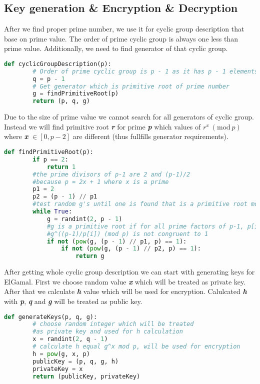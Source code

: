 \documentclass[a4paper,12pt]{article}
\newcommand{\Mod}[1]{\ (\mathrm{mod}\ #1)}
\begin{document}
\subsection{Key generation \& Encryption \& Decryption}
After we find proper prime number, we use it for cyclic group description that base on prime value. 
The order of prime cyclic group is always one less than prime value. Additionally, we need to find generator of that cyclic group. 
\begin{lstlisting}[language=Python]
    def cyclicGroupDescription(p):
        # Order of prime cyclic group is p - 1 as it has p - 1 elements in group
        q = p - 1
        # Get generator which is primitive root of prime number
        g = findPrimitiveRoot(p)
        return (p, q, g)
\end{lstlisting}
Due to the size of prime value we cannot search for all generators of cyclic group. 
Instead we will find primitive root \textbf{\textit{r}} for prime \textbf{\textit{p}} which values of $r^x \Mod p$ where \textbf{\textit{x}}  $\in [0, p-2]$ are different (thus fullfills generator requirements). 
\begin{lstlisting}[language=Python]
    def findPrimitiveRoot(p):
        if p == 2:
            return 1
        #the prime divisors of p-1 are 2 and (p-1)/2 
        #because p = 2x + 1 where x is a prime
        p1 = 2
        p2 = (p - 1) // p1
        #test random g's until one is found that is a primitive root mod p
        while True:
            g = randint(2, p - 1)
            #g is a primitive root if for all prime factors of p-1, p[i]
            #g^((p-1)/p[i]) (mod p) is not congruent to 1
            if not (pow(g, (p - 1) // p1, p) == 1):
                if not (pow(g, (p - 1) // p2, p) == 1):
                    return g
\end{lstlisting}
After getting whole cyclic group description we can start with generating keys for ElGamal. 
First we choose random value \textbf{\textit{x}} which will be treated as private key. 
After that we calculate \textbf{\textit{h}} value which will be used for encryption. 
Calulcated \textbf{\textit{h}} with \textbf{\textit{p}}, \textbf{\textit{q}} and \textbf{\textit{g}} will be treated as public key. 
\begin{lstlisting}[language=Python]
    def generateKeys(p, q, g):
        # choose random integer which will be treated 
        #as private key and used for h calculation 
        x = randint(2, q - 1) 
        # calculate h equal g^x mod p, will be used for encryption
        h = pow(g, x, p) 
        publicKey = (p, q, g, h)
        privateKey = x
        return (publicKey, privateKey)
\end{lstlisting} \newpage 
\end{document}
